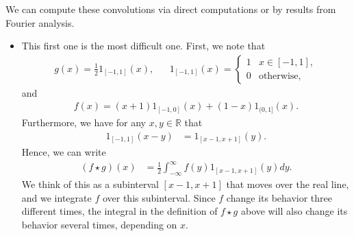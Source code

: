 \documentclass[11pt]{article}
\begin{document}
\begin{solution}
    We can compute these convolutions via direct computations or by results from Fourier analysis.
    \begin{itemize}
        \item 
        This first one is the most difficult one. First, we note that
        \begin{align*}
            g(x) = \frac 1 2 1_{[-1,1]}(x), & & 1_{[-1,1]}(x) = \begin{cases}
                1 & x \in [-1,1],\\
                0 & \text{otherwise},
            \end{cases}
        \end{align*}
        and
        \begin{align*}
            f(x) = (x+1) 1_{[-1,0]}(x) + (1-x) 1_{(0,1]}(x).
        \end{align*}
        Furthermore, we have for any $x, y \in \mathbb R$ that
        \begin{align*}
            1_{[-1, 1]}(x - y) &= 1_{[x - 1, x + 1]}(y).
        \end{align*}
        Hence, we can write
        \begin{align*}
            ( f \star g )(x) &= \frac 1 2 \int_{-\infty}^\infty f(y) 1_{[x - 1, x + 1]}(y) dy.
        \end{align*}
        We think of this as a subinterval $[x-1,x+1]$ that moves over the real line, 
        and we integrate $f$ over this subinterval. 
        Since $f$ change its behavior three different times, the integral in the definition of $f \star g$ above will also change its behavior several times, depending on $x$.
        

\end{itemize}
\end{solution}
\end{document}
